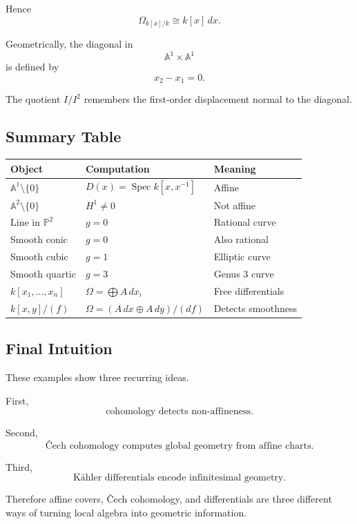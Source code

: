 \documentclass[12pt,a4paper]{article}
\theoremstyle{notespace}
\begin{document}
Hence
\[
\Omega_{k[x]/k}
\cong
k[x]\,dx.
\]

Geometrically, the diagonal in
\[
\mathbb A^1\times\mathbb A^1
\]
is defined by
\[
x_2-x_1=0.
\]

The quotient $I/I^2$ remembers the first-order displacement normal to the
diagonal.

\subsection{Summary Table}

\begin{center}
	\begin{tabular}{|l|l|l|}
		\hline
		Object & Computation & Meaning \\
		\hline
		$\mathbb A^1\setminus\{0\}$ &
		$D(x)=\operatorname{Spec}k[x,x^{-1}]$ &
		Affine \\
		\hline
		$\mathbb A^2\setminus\{0\}$ &
		$H^1\neq0$ &
		Not affine \\
		\hline
		Line in $\mathbb P^2$ &
		$g=0$ &
		Rational curve \\
		\hline
		Smooth conic &
		$g=0$ &
		Also rational \\
		\hline
		Smooth cubic &
		$g=1$ &
		Elliptic curve \\
		\hline
		Smooth quartic &
		$g=3$ &
		Genus $3$ curve \\
		\hline
		$k[x_1,\ldots,x_n]$ &
		$\Omega=\bigoplus A\,dx_i$ &
		Free differentials \\
		\hline
		$k[x,y]/(f)$ &
		$\Omega=(A\,dx\oplus A\,dy)/(df)$ &
		Detects smoothness \\
		\hline
	\end{tabular}
\end{center}

\subsection{Final Intuition}

These examples show three recurring ideas.

First,
\[
\boxed{
	\text{cohomology detects non-affineness.}
}
\]

Second,
\[
\boxed{
	\text{\v{C}ech cohomology computes global geometry from affine charts.}
}
\]

Third,
\[
\boxed{
	\text{K\"ahler differentials encode infinitesimal geometry.}
}
\]

Therefore affine covers, \v{C}ech cohomology, and differentials are three
different ways of turning local algebra into geometric information.
\end{document}
